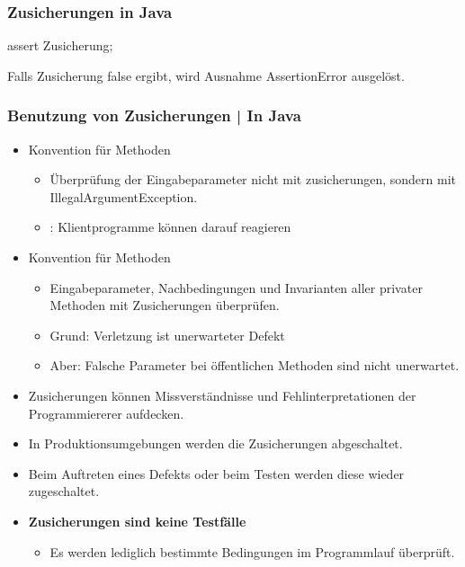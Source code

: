 \subsubsection{Zusicherungen in Java}
\begin{code}
    assert Zusicherung;
\end{code}

Falls Zusicherung false ergibt, wird Ausnahme AssertionError ausgelöst.

\subsubsection{Benutzung von Zusicherungen | In Java}
\begin{itemize}
    \item Konvention für  Methoden
\begin{itemize}
    \item Überprüfung der Eingabeparameter nicht mit zusicherungen, sondern mit IllegalArgumentException.
    \item {}: Klientprogramme können darauf reagieren
\end{itemize}
\item Konvention für  Methoden
\begin{itemize}
    \item Eingabeparameter, Nachbedingungen und Invarianten aller privater Methoden mit Zusicherungen überprüfen.
    \item Grund: Verletzung ist unerwarteter Defekt
    \item Aber: Falsche Parameter bei öffentlichen Methoden sind nicht unerwartet.
\end{itemize}
\item Zusicherungen können Missverständnisse und Fehlinterpretationen der Programmiererer aufdecken.
\item In Produktionsumgebungen werden die Zusicherungen abgeschaltet.
\item Beim Auftreten eines Defekts oder beim Testen werden diese wieder zugeschaltet.
\item \textbf{Zusicherungen sind keine Testfälle}
\begin{itemize}
    \item Es werden lediglich bestimmte Bedingungen im Programmlauf überprüft.
\end{itemize}
\end{itemize}

